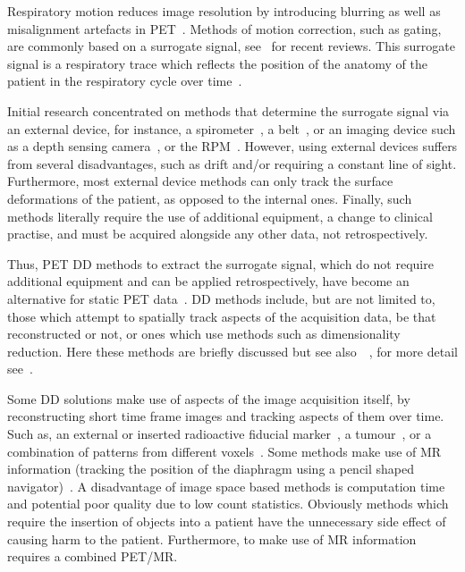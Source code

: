             Respiratory motion reduces image resolution by introducing blurring as well as misalignment artefacts in \gls{PET}~\parencite{Nehmeh2008a}. Methods of motion correction, such as gating, are commonly based on a surrogate signal, see~\parencite{Lamare2022PETVadis} for recent reviews. This surrogate signal is a respiratory trace which reflects the position of the anatomy of the patient in the respiratory cycle over time~\parencite{Kesner2010AMethods, Kesner2013GatingPET}.

            Initial research concentrated on methods that determine the surrogate signal via an external device, for instance, a spirometer~\parencite{Voscopoulos2013EvaluationScenarios}, a belt~\parencite{Yu2016}, or an imaging device such as a depth sensing camera~\parencite{Silverstein2018ComparativeSensor, Xia2012AConcept}, or the \gls{RPM}~\parencite{Bettinardi2013Motion-trackingPET/CT}. However, using external devices suffers from several disadvantages, such as  drift and/or requiring a constant line of sight. Furthermore, most external device methods can only track the surface deformations of the patient, as opposed to the internal ones. Finally, such methods literally require the use of additional equipment, a change to clinical practise, and must be acquired alongside any other data, not retrospectively.

            Thus, \gls{PET} \gls{DD} methods to extract the surrogate signal, which do not require additional equipment and can be applied retrospectively, have become an alternative for static \gls{PET} data~\parencite{Kesner2014OnFramework}. \gls{DD} methods include, but are not limited to, those which attempt to spatially track aspects of the acquisition data, be that reconstructed or not, or ones which use methods such as dimensionality reduction. Here these methods are briefly discussed but see also~~\parencite{Lamare2022PETVadis}, for more detail see~.

            Some \gls{DD} solutions make use of aspects of the image acquisition itself, by reconstructing short time frame images and tracking aspects of them over time. Such as, an external or inserted radioactive fiducial marker~\parencite{Buther2013ExternalTomography., Zimmermann2003UseMRI}, a tumour~\parencite{Bundschuh2007}, or a combination of patterns from different voxels~\parencite{Kesner2009RespiratoryData}. Some methods make use of \gls{MR} information (tracking the position of the diaphragm using a pencil shaped navigator)~\parencite{Taylor1997MRAngiography, Furst2015MotionPET/MR}. A disadvantage of image space based methods is computation time and potential poor quality due to low count statistics. Obviously methods which require the insertion of objects into a patient have the unnecessary side effect of causing harm to the patient. Furthermore, to make use of \gls{MR} information requires a combined \gls{PET}/\gls{MR}.
    
